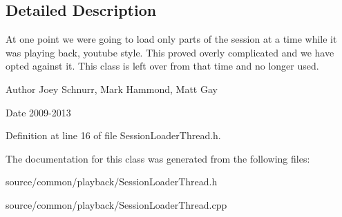 \subsection{Detailed Description}
At one point we were going to load only parts of the session at a time while it was playing back, youtube style. This proved overly complicated and we have opted against it. This class is left over from that time and no longer used. 

\begin{DoxyAuthor}{Author}
Joey Schnurr, Mark Hammond, Matt Gay 
\end{DoxyAuthor}
\begin{DoxyDate}{Date}
2009-\/2013 
\end{DoxyDate}


Definition at line 16 of file Session\-Loader\-Thread.\-h.



The documentation for this class was generated from the following files\-:\begin{DoxyCompactItemize}
\item 
source/common/playback/Session\-Loader\-Thread.\-h\item 
source/common/playback/Session\-Loader\-Thread.\-cpp\end{DoxyCompactItemize}
